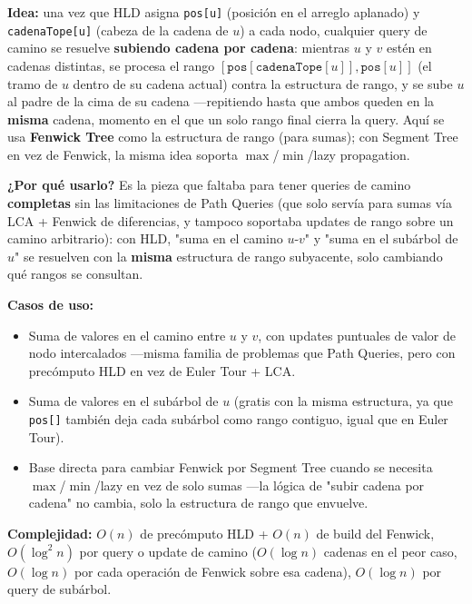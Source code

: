 \documentclass[10pt,a4paper,twocolumn]{article}
\begin{document}
\textbf{Idea:} una vez que HLD asigna \texttt{pos[u]} (posición en el
arreglo aplanado) y \texttt{cadenaTope[u]} (cabeza de la cadena de
$u$) a cada nodo, cualquier query de camino se resuelve
\textbf{subiendo cadena por cadena}: mientras $u$ y $v$ estén en
cadenas distintas, se procesa el rango
$[\texttt{pos}[\texttt{cadenaTope}[u]], \texttt{pos}[u]]$ (el tramo
de $u$ dentro de su cadena actual) contra la estructura de rango, y
se sube $u$ al padre de la cima de su cadena —repitiendo hasta que
ambos queden en la \textbf{misma} cadena, momento en el que un solo
rango final cierra la query. Aquí se usa \textbf{Fenwick Tree} como
la estructura de rango (para sumas); con Segment Tree en vez de
Fenwick, la misma idea soporta $\max$/$\min$/lazy propagation.

\textbf{¿Por qué usarlo?} Es la pieza que faltaba para tener queries
de camino \textbf{completas} sin las limitaciones de Path Queries
(que solo servía para sumas vía LCA + Fenwick de diferencias, y
tampoco soportaba updates de rango sobre un camino arbitrario): con
HLD, "suma en el camino $u$-$v$" y "suma en el subárbol de $u$" se
resuelven con la \textbf{misma} estructura de rango subyacente, solo
cambiando qué rangos se consultan.

\textbf{Casos de uso:}

\begin{itemize}
    \item Suma de valores en el camino entre $u$ y $v$, con updates
    puntuales de valor de nodo intercalados —misma familia de
    problemas que Path Queries, pero con precómputo HLD en vez de
    Euler Tour + LCA.
    \item Suma de valores en el subárbol de $u$ (gratis con la misma
    estructura, ya que \texttt{pos[]} también deja cada subárbol como
    rango contiguo, igual que en Euler Tour).
    \item Base directa para cambiar Fenwick por Segment Tree cuando
    se necesita $\max$/$\min$/lazy en vez de solo sumas —la lógica de
    "subir cadena por cadena" no cambia, solo la estructura de rango
    que envuelve.
\end{itemize}

\textbf{Complejidad:} $O(n)$ de precómputo HLD + $O(n)$ de build del
Fenwick, $O(\log^2 n)$ por query o update de camino ($O(\log n)$
cadenas en el peor caso, $O(\log n)$ por cada operación de Fenwick
sobre esa cadena), $O(\log n)$ por query de subárbol.
\end{document}
